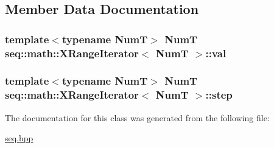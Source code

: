 \subsection{Member Data Documentation}
\hypertarget{classseq_1_1math_1_1_x_range_iterator_aab232a017c574d7190828cc2633aad4a}{
\subsubsection[{val}]{\setlength{\rightskip}{0pt plus 5cm}template$<$typename Num\-T$>$ Num\-T {\bf seq\-::math\-::\-X\-Range\-Iterator}$<$ Num\-T $>$\-::{\bf val}}}\label{classseq_1_1math_1_1_x_range_iterator_aab232a017c574d7190828cc2633aad4a}
\hypertarget{classseq_1_1math_1_1_x_range_iterator_a73d7e94422117d0f2eff60edb9cb4273}{
\subsubsection[{step}]{\setlength{\rightskip}{0pt plus 5cm}template$<$typename Num\-T$>$ Num\-T {\bf seq\-::math\-::\-X\-Range\-Iterator}$<$ Num\-T $>$\-::{\bf step}}}\label{classseq_1_1math_1_1_x_range_iterator_a73d7e94422117d0f2eff60edb9cb4273}


The documentation for this class was generated from the following file\-:\begin{DoxyCompactItemize}
\item 
\hyperlink{seq_8hpp}{seq.\-hpp}\end{DoxyCompactItemize}
